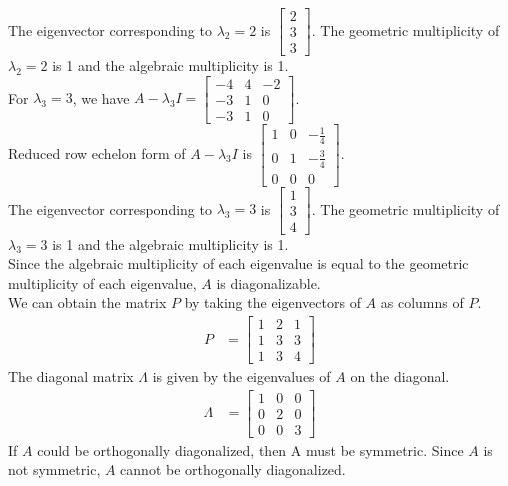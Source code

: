 The eigenvector corresponding to $\lambda_2 = 2$ is $\begin{bmatrix} 2 \\ 3 \\ 3 \end{bmatrix}$. The geometric multiplicity of $\lambda_2 = 2$ is 1 and the algebraic multiplicity is 1.\\
For $\lambda_3 = 3$, we have $A - \lambda_3 I = \begin{bmatrix} -4 & 4 & -2 \\ -3 & 1 & 0 \\ -3 & 1 & 0 \end{bmatrix}$.\\
Reduced row echelon form of $A - \lambda_3 I$ is $\begin{bmatrix} 1 & 0 & -\frac{1}{4} \\ 0 & 1 & -\frac{3}{4} \\ 0 & 0 & 0 \end{bmatrix}$.\\
The eigenvector corresponding to $\lambda_3 = 3$ is $\begin{bmatrix} 1 \\ 3 \\ 4 \end{bmatrix}$. The geometric multiplicity of $\lambda_3 = 3$ is 1 and the algebraic multiplicity is 1.\\
Since the algebraic multiplicity of each eigenvalue is equal to the geometric multiplicity of each eigenvalue, $A$ is diagonalizable.\\
We can obtain the matrix $P$ by taking the eigenvectors of $A$ as columns of $P$.
\begin{align*}
    P &= \begin{bmatrix} 1 & 2 & 1 \\ 1 & 3 & 3 \\ 1 & 3 & 4 \end{bmatrix}
\end{align*}
The diagonal matrix $\Lambda$ is given by the eigenvalues of $A$ on the diagonal.
\begin{align*}
    \Lambda &= \begin{bmatrix} 1 & 0 & 0 \\ 0 & 2 & 0 \\ 0 & 0 & 3 \end{bmatrix}
\end{align*}
If $A$ could be orthogonally diagonalized, then A must be symmetric. Since $A$ is not symmetric, $A$ cannot be orthogonally diagonalized.\\

